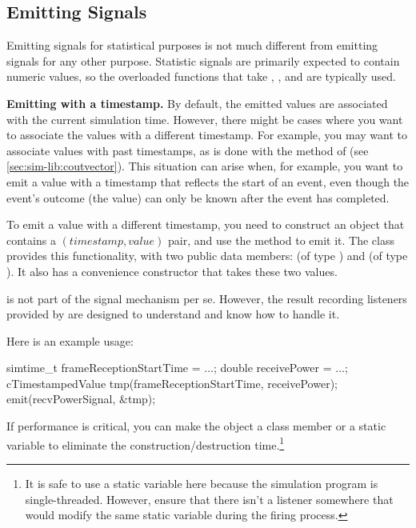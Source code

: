 \subsection{Emitting Signals}
\label{sec:simple-modules:emitting-statistic-signals}

Emitting signals for statistical purposes is not much different from
emitting signals for any other purpose. Statistic signals are primarily
expected to contain numeric values, so the overloaded  functions
that take , , and  are typically used.

\textbf{Emitting with a timestamp.} By default, the emitted values are associated with
the current simulation time. However, there might be cases where you want
to associate the values with a different timestamp. For example, you may want
to associate values with past timestamps, as is done with the 
method of  (see \ref{sec:sim-lib:coutvector}). This situation
can arise when, for example, you want to emit a value with a timestamp that reflects the
start of an event, even though the event's outcome (the value) can only be
known after the event has completed.

To emit a value with a different timestamp, you need to construct an object
that contains a $(timestamp, value)$ pair, and use the 
method to emit it. The  class provides this functionality,
with two public data members:  (of type ) and
 (of type ). It also has a convenience constructor that
takes these two values.

\begin{note}
 is not part of the signal mechanism per se. However,
the result recording listeners provided by {\opp} are designed to understand
 and know how to handle it.
\end{note}

Here is an example usage:

\begin{cpp}
simtime_t frameReceptionStartTime = ...;
double receivePower = ...;
cTimestampedValue tmp(frameReceptionStartTime, receivePower);
emit(recvPowerSignal, &tmp);
\end{cpp}

If performance is critical, you can make the  object a
class member or a static variable to eliminate the construction/destruction
time.\footnote{It is safe to use a static variable here because the simulation
program is single-threaded. However, ensure that there isn't a listener
somewhere that would modify the same static variable during the firing process.}

